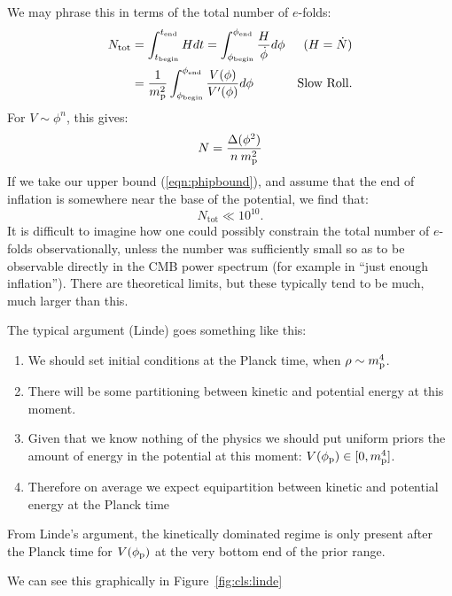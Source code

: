 We may phrase this in terms of the total number of $e$-folds:
\begin{align}
  N_\mathrm{tot} 
  &=\int_{t_\mathrm{begin}}^{t_\mathrm{end}} H dt 
  =\int_{\phi_\mathrm{begin}}^{\phi_\mathrm{end}} 
       \frac{H}{\dot{\phi}}d\phi  &\text{($H=\dot{N}$)}
  \\
  &=\frac{1}{m_{\mathrm{p}}^2}\int_{\phi_\mathrm{begin}}^{\phi_\mathrm{end}}
     {\frac{V(\phi)}{V^\prime(\phi)}}d\phi &\text{Slow Roll.}
\end{align}
For $V\sim\phi^n$, this gives:
\begin{equation}
  N = \frac{\Delta (\phi^2) }{n\:m_{\mathrm{p}}^2}
\end{equation}
If we take our upper bound (\ref{eqn:phipbound}), and assume that the
end of inflation is somewhere near the base of the potential, we find
that: 
\begin{equation}
  N_\mathrm{tot}\ll 10^{10}.
\end{equation}
It is difficult to imagine how one could possibly constrain the total
number of $e$-folds observationally, unless the number was
sufficiently small so as to be observable directly in the CMB power
spectrum (for example in ``just enough inflation''). There are
theoretical limits, but these typically tend to be much, much larger
than this.

The typical argument (Linde) goes something like this:

\begin{enumerate}
  \item We should set initial conditions at the Planck time, when
    $\rho\sim m_{\mathrm{p}}^4$.
  \item There will be some partitioning between kinetic and potential
    energy at this moment.
  \item Given that we know nothing of the physics we should put
    uniform priors the amount of energy in the potential at this
    moment: $V(\phi_{\mathrm{p}})\in[0,m_{\mathrm{p}}^4]$.
  \item Therefore on average we expect equipartition between kinetic
    and potential energy at the Planck time
\end{enumerate}

From Linde's argument, the kinetically dominated regime is only present
after the Planck time for $V(\phi_{\mathrm{p}})$ at the very bottom end of the
prior range.

We can see this graphically in Figure~\ref{fig:cls:linde}

